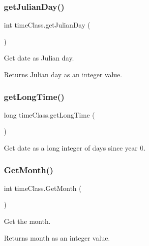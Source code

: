 \subsubsection{\texorpdfstring{getJulianDay()}{getJulianDay()}}
{\footnotesize\ttfamily int time\+Class.\+get\+Julian\+Day (\begin{DoxyParamCaption}{ }\end{DoxyParamCaption})\hspace{0.3cm}{\ttfamily [inline]}}



Get date as Julian day. 

\begin{DoxyReturn}{Returns}
Julian day as an integer value. 
\end{DoxyReturn}
\mbox{\label{classtime_class_ada28c20d7a0a54db849c7dd19638f6d5}} 
\subsubsection{\texorpdfstring{getLongTime()}{getLongTime()}}
{\footnotesize\ttfamily long time\+Class.\+get\+Long\+Time (\begin{DoxyParamCaption}{ }\end{DoxyParamCaption})\hspace{0.3cm}{\ttfamily [inline]}}



Get date as a long integer of days since year 0. 

\mbox{\label{classtime_class_a33068a0b7d33d339875e4e31382223f2}} 
\subsubsection{\texorpdfstring{GetMonth()}{GetMonth()}}
{\footnotesize\ttfamily int time\+Class.\+Get\+Month (\begin{DoxyParamCaption}{ }\end{DoxyParamCaption})\hspace{0.3cm}{\ttfamily [inline]}}



Get the month. 

\begin{DoxyReturn}{Returns}
month as an integer value. 
\end{DoxyReturn}
\mbox{\label{classtime_class_afe3b5cacaca30b738a82ceea12d9afda}} 
